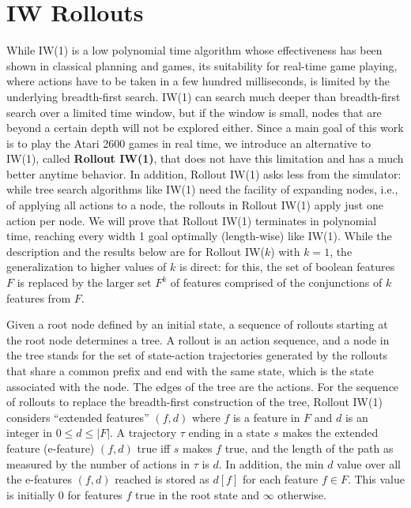 \documentclass[letterpaper]{article}
\newcommand{\pair}[1]{{(#1)}}
\begin{document}
\section{IW Rollouts}

While IW(1) is a low polynomial time algorithm whose effectiveness has been shown in classical planning and games,
its suitability for real-time game playing, where actions have to be taken in a few hundred milliseconds,
is limited by  the underlying breadth-first search.  IW(1) can  search much deeper than
breadth-first search over a limited time window,  but if the window is small,
nodes that are beyond a certain depth  will not be explored either.
Since a main  goal of this work is to play the Atari 2600 games in real time,
we introduce an alternative to IW(1), called \textbf{Rollout IW(1)}, that does not have this limitation and has a
much better anytime behavior.
In addition, Rollout IW(1) asks less from the simulator: while tree search algorithms like IW(1) need the facility of
expanding nodes, i.e., of applying all actions to a node, the rollouts in Rollout IW(1) apply
just one action per node.  We will prove  that Rollout IW(1) terminates
in polynomial time, reaching every  width 1 goal  optimally (length-wise) like IW(1).
While the description and the results below are for Rollout IW($k$) with $k=1$,
the generalization to higher values of $k$ is direct: for this, the set of boolean features $F$ is
replaced by the larger set $F^k$ of features comprised of  the  conjunctions  of $k$ features from $F$.

Given a root node defined by an  initial state, a sequence of rollouts starting at the root node
determines a tree. A rollout is an action sequence, and a node in the tree stands
for the  set of state-action trajectories generated by the rollouts that
share  a common prefix and end with the same  state, which is the state
associated with the node. The edges of the tree are the actions.
For the sequence of rollouts to  replace the breadth-first construction of the tree,
Rollout IW(1) considers ``extended features''  $\pair{f,d}$ where $f$ is a feature in $F$ and $d$ is an integer in
$0 \leq d \leq |F|$. A trajectory  $\tau$ ending in a state $s$ makes the extended feature (e-feature) $\pair{f,d}$ true
iff $s$ makes $f$ true, and the length of the path as measured by the number of actions in $\tau$ is $d$.
In addition, the min $d$ value over all the e-features $\pair{f,d}$ reached is stored as $d[f]$
for each feature $f \in F$. This  value  is initially $0$ for features $f$ true in the root state
and $\infty$ otherwise.
\end{document}
